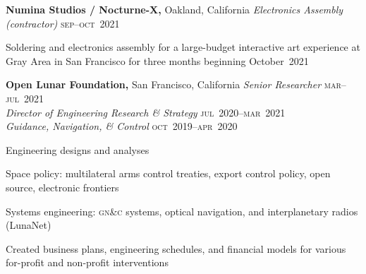 \documentclass[12pt,letterpaper]{article}
\newenvironment{itemize*}%
{\begin{itemize}%
  \setlength{\itemsep}{0pt}}%
{\end{itemize}}
\newcommand{\rdate}[1]{{\hfill #1}}
\begin{document}
%
\medskip
\textbf{Numina Studios / Nocturne-X,} Oakland, California \newline
\emph{Electronics Assembly (contractor)} \rdate{\textsc{sep}--\textsc{oct}~2021}
\begin{itemize*}
   \item Soldering and electronics assembly for a large-budget interactive art experience at Gray Area in San Francisco for three months beginning October~2021
\end{itemize*}
%
%
\medskip
\textbf{Open Lunar Foundation,} San Francisco, California \newline
\emph{Senior Researcher} \rdate{\textsc{mar}--\textsc{jul}~2021} \\
\emph{Director of Engineering Research \& Strategy} \rdate{\textsc{jul}~2020--\textsc{mar}~2021} \\
\emph{Guidance, Navigation, \& Control} \rdate{\textsc{oct}~2019--\textsc{apr}~2020}
\begin{itemize*}
  \item Engineering designs and analyses
  \item Space policy: multilateral arms control treaties, export control policy, open source, electronic frontiers
  \item Systems engineering: \textsc{gn\&c} systems, optical navigation, and interplanetary radios (LunaNet)
  \item Created business plans, engineering schedules, and financial models for various for-profit and non-profit interventions
\end{itemize*}
\end{document}
